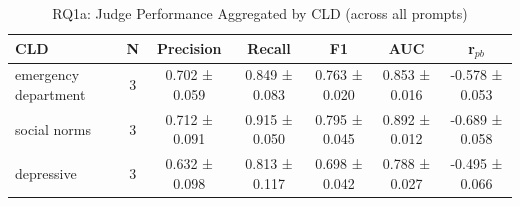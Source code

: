 \begin{table}[htbp]
\centreing
\caption{RQ1a: Judge Performance Aggregated by CLD (across all prompts)}
\label{tab:rq1a_by_cld}
\begin{tabular}{lcccccc}
\toprule
\textbf{CLD} & \textbf{N} & \textbf{Precision} & \textbf{Recall} & \textbf{F1} & \textbf{AUC} & \textbf{r$_{pb}$} \\
\midrule
emergency department & 3 & 0.702 ± 0.059 & 0.849 ± 0.083 & 0.763 ± 0.020 & 0.853 ± 0.016 & -0.578 ± 0.053 \\
social norms & 3 & 0.712 ± 0.091 & 0.915 ± 0.050 & 0.795 ± 0.045 & 0.892 ± 0.012 & -0.689 ± 0.058 \\
depressive & 3 & 0.632 ± 0.098 & 0.813 ± 0.117 & 0.698 ± 0.042 & 0.788 ± 0.027 & -0.495 ± 0.066 \\
\bottomrule
\end{tabular}
\end{table}
